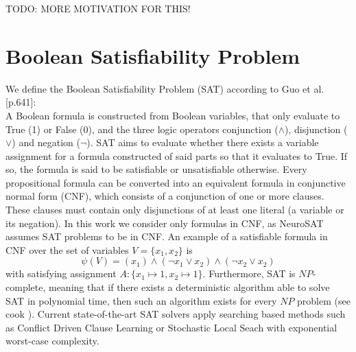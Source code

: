TODO: MORE MOTIVATION FOR THIS!


\section{Boolean Satisfiability Problem}
\label{sec:SAT}
We define the Boolean Satisfiability Problem (SAT) according to Guo et al. \cite{guo2023machine}[p.641]: \\
A Boolean formula is constructed from Boolean variables, that only evaluate to True (1) or False (0), and the three logic operators conjunction ($\wedge$), disjunction ($\vee$) and negation ($\neg$). SAT aims to evaluate whether there exists a variable assignment for a formula constructed of said parts so that it evaluates to True. If so, the formula is said to be satisfiable or unsatisfiable otherwise. Every propositional formula can be converted into an equivalent formula in conjunctive normal form (CNF), which consists of a conjunction of one or more clauses. These clauses must contain only disjunctions of at least one literal (a variable or its negation). In this work we consider only formulas in CNF, as NeuroSAT \cite{selsam2018learning} assumes SAT problems to be in CNF. An example of a satisfiable formula in CNF over the set of variables $V=\{x_1,x_2\}$ is 
$$\psi(V) = (x_1) \land (\neg x_1 \lor x_2) \land (\neg x_2 \lor x_2)$$
with satisfying assignment $A:\{x_1 \mapsto 1, x_2 \mapsto 1\}$. Furthermore, SAT is $NP$-complete, meaning that if there exists a deterministic algorithm able to solve SAT in polynomial time, then such an algorithm exists for every $NP$ problem (see cook \cite{cook2023complexity}). Current state-of-the-art SAT solvers apply searching based methods such as Conflict Driven Clause Learning \cite{marques1999grasp} or Stochastic Local Seach \cite{selman1993local} with exponential worst-case complexity.


